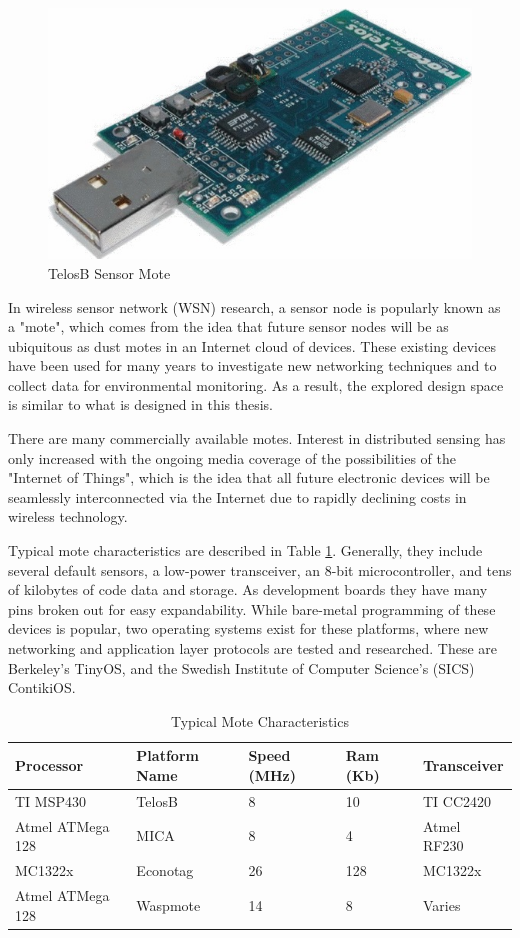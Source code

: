 \begin{figure}[h]
\includegraphics{images/telosB}
\caption{TelosB Sensor Mote\cite{1440950}}
\label{telosB}
\end{figure}

In wireless sensor network (WSN) research, a sensor node is popularly known as a "mote", which comes from the idea that future sensor nodes will be as ubiquitous as dust motes in an Internet cloud of devices. These existing devices have been used for many years to investigate new networking techniques and to collect data for environmental monitoring. As a result, the explored design space is similar to what is designed in this thesis. 

There are many commercially available motes. Interest in distributed sensing has only increased with the ongoing media coverage of the possibilities of the "Internet of Things", which is the idea that all future electronic devices will be seamlessly interconnected via the Internet due to rapidly declining costs in wireless technology. 

Typical mote characteristics are described in Table \ref{mote_characteristics}. Generally, they include several default sensors, a low-power transceiver, an 8-bit microcontroller, and tens of kilobytes of code data and storage. As development boards they have many pins broken out for easy expandability. While bare-metal programming of these devices is popular, two operating systems exist for these platforms, where new networking and application layer protocols are tested and researched. These are Berkeley's TinyOS, and the Swedish Institute of Computer Science's (SICS) ContikiOS.

\begin{table}[h]
\begin{tabular}{@{}lllll@{}}
\toprule
Processor & Platform Name & Speed (MHz) & Ram (Kb) & Transceiver \\ \midrule
TI MSP430 & TelosB & 8 & 10 & TI CC2420 \\
Atmel ATMega 128 & MICA & 8 & 4 & Atmel RF230 \\
MC1322x & Econotag & 26 & 128 & MC1322x \\
Atmel ATMega 128 & Waspmote & 14 & 8 & Varies \\ \bottomrule
\end{tabular}
\caption{Typical Mote Characteristics}
\label{mote_characteristics}
\end{table}

